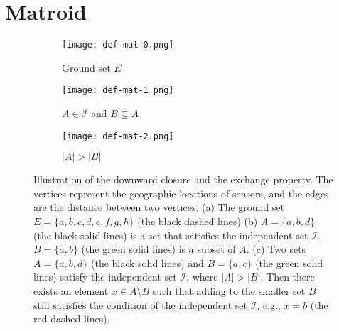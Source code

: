 \section{Matroid}

\begin{figure}
   \centering
   \begin{subfigure}[b]{0.3\textwidth}
       \texttt{[image: def-mat-0.png]}
       \caption{Ground set $E$}
   \end{subfigure}
   \hfill
   \quad
   \centering
   \begin{subfigure}[b]{0.3\textwidth}
       \texttt{[image: def-mat-1.png]}
       \caption{$A \in \mathcal{I}$ and $B \subseteq A$}
   \end{subfigure}
   \hfill
   \quad
   \begin{subfigure}[b]{0.3\textwidth}
   \centering
       \texttt{[image: def-mat-2.png]}
       \caption{$|A|>|B|$}
   \end{subfigure}
   \hfill

   \caption{Illustration of the downward closure and the exchange property.
   The vertices represent the geographic locations of sensors, and the edges are the distance between two vertices. (a) The ground set $E=\{a,b,c,d,e,f,g,h\}$ (the black dashed lines) (b) $A=\{a,b,d\}$ (the black solid lines) is a set that satisfies the independent set $\mathcal{I}$. $B=\{a,b\}$ (the green solid lines) is a subset of $A$.
   (c) Two sets $A=\{a,b,d\}$ (the black solid lines) and $B=\{a,c\}$ (the green solid lines) satisfy the independent set $\mathcal{I}$, where $|A|>|B|$. Then there exists an element $x \in A \setminus B$ such that adding to the smaller set $B$ still satisfies the condition of the independent set $\mathcal{I}$, e.g., $x=b$ (the red dashed lines).
   }
   \label{def-matroid}
\end{figure}

